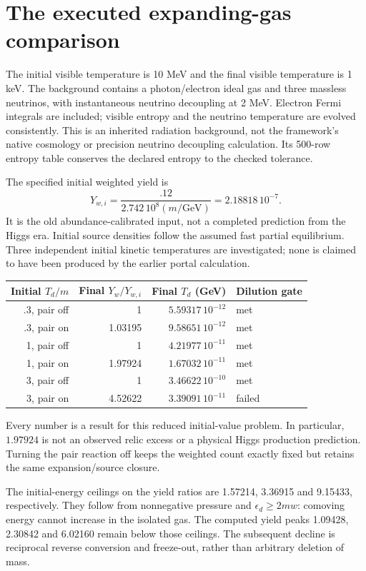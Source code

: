 \documentclass[11pt]{article}
\begin{document}
\section{The executed expanding-gas comparison}
The initial visible temperature is 10 MeV and the final visible temperature
is 1 keV. The background contains a photon/electron ideal gas and three
massless neutrinos, with instantaneous neutrino decoupling at 2 MeV.
Electron Fermi integrals are included; visible entropy and the neutrino
temperature are evolved consistently. This is an inherited radiation
background, not the framework's native cosmology or precision neutrino
decoupling calculation. Its 500-row entropy table conserves the declared
entropy to the checked tolerance.

The specified initial weighted yield is
\begin{equation}
 Y_{w,i}=\frac{.12}{2.742\,10^8(m/\mathrm{GeV})}
 =2.18818\,10^{-7}.
\end{equation}
It is the old abundance-calibrated input, not a completed prediction from
the Higgs era. Initial source densities follow the assumed fast partial
equilibrium. Three independent initial kinetic temperatures are investigated;
none is claimed to have been produced by the earlier portal calculation.

\begin{center}
\begin{tabular}{r r r l}
\toprule Initial $T_d/m$ & Final $Y_w/Y_{w,i}$ & Final $T_d$ (GeV) & Dilution gate\\\midrule
.3, pair off & 1 & $5.59317\,10^{-12}$ & met\\
.3, pair on & 1.03195 & $9.58651\,10^{-12}$ & met\\
1, pair off & 1 & $4.21977\,10^{-11}$ & met\\
1, pair on & 1.97924 & $1.67032\,10^{-11}$ & met\\
3, pair off & 1 & $3.46622\,10^{-10}$ & met\\
3, pair on & 4.52622 & $3.39091\,10^{-11}$ & failed\\\bottomrule
\end{tabular}
\end{center}
Every number is a result for this reduced initial-value problem. In
particular, $1.97924$ is not an observed relic excess or a physical Higgs
production prediction. Turning the pair reaction off keeps the weighted
count exactly fixed but retains the same expansion/source closure.

The initial-energy ceilings on the yield ratios are 1.57214, 3.36915 and
9.15433, respectively. They follow from nonnegative pressure and
$\epsilon_d\ge2mw$: comoving energy cannot increase in the isolated gas.
The computed yield peaks 1.09428, 2.30842 and 6.02160 remain below those
ceilings. The subsequent decline is reciprocal reverse conversion and
freeze-out, rather than arbitrary deletion of mass.
\end{document}
